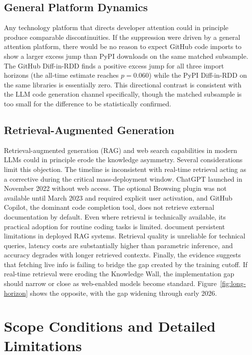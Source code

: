 \documentclass[12pt, a4paper]{report}
\begin{document}
\section*{General Platform Dynamics}
Any technology platform that directs developer attention could in principle produce comparable discontinuities. If the suppression were driven by a general attention platform, there would be no reason to expect GitHub code imports to show a larger excess jump than PyPI downloads on the same matched subsample. The GitHub Diff-in-RDD finds a positive excess jump for all three import horizons (the all-time estimate reaches $p = 0.060$) while the PyPI Diff-in-RDD on the same libraries is essentially zero. This directional contrast is consistent with the LLM code generation channel specifically, though the matched subsample is too small for the difference to be statistically confirmed.

\section*{Retrieval-Augmented Generation}
Retrieval-augmented generation (RAG) and web search capabilities in modern LLMs could in principle erode the knowledge asymmetry. Several considerations limit this objection. The timeline is inconsistent with real-time retrieval acting as a corrective during the critical mass-deployment window. ChatGPT launched in November 2022 without web access. The optional Browsing plugin was not available until March 2023 and required explicit user activation, and GitHub Copilot, the dominant code completion tool, does not retrieve external documentation by default. Even where retrieval is technically available, its practical adoption for routine coding tasks is limited. \citet{gao2024retrieval} document persistent limitations in deployed RAG systems. Retrieval quality is unreliable for technical queries, latency costs are substantially higher than parametric inference, and accuracy degrades with longer retrieved contexts. Finally, the evidence suggests that fetching live info is failing to bridge the gap created by the training cutoff. If real-time retrieval were eroding the Knowledge Wall, the implementation gap should narrow or close as web-enabled models become standard. Figure~\ref{fig:long-horizon} shows the opposite, with the gap widening through early 2026.

\chapter{Scope Conditions and Detailed Limitations}\label{app:scope}
\end{document}

